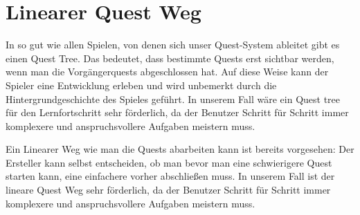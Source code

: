 \section{Linearer Quest Weg}
In so gut wie allen Spielen, von denen sich unser Quest-System ableitet gibt es einen Quest Tree.
Das bedeutet, dass bestimmte Quests erst sichtbar werden, wenn man die Vorgängerquests
abgeschlossen hat. Auf diese Weise kann der Spieler eine Entwicklung erleben und wird unbemerkt
durch die Hintergrundgeschichte des Spieles geführt. In unserem Fall wäre ein Quest tree für den
Lernfortschritt sehr förderlich, da der Benutzer Schritt für Schritt immer komplexere und
anspruchsvollere Aufgaben meistern muss.

Ein Linearer Weg wie man die Quests abarbeiten kann ist bereits vorgesehen: Der Ersteller kann selbst entscheiden, ob man bevor man eine schwierigere Quest starten kann, eine einfachere vorher abschließen muss. In unserem Fall ist der lineare Quest Weg sehr förderlich, da der Benutzer Schritt für Schritt immer komplexere und anspruchsvollere Aufgaben meistern muss.
